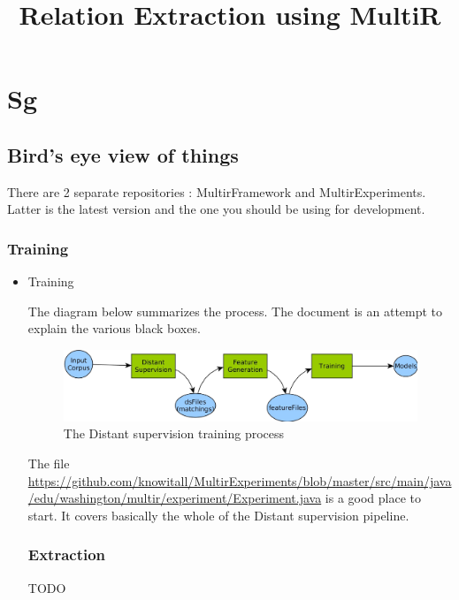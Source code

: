 \documentclass[a4paper,10pt]{report}
\title{Relation Extraction using MultiR}
\author{}
\begin{document}
\maketitle

\begin{abstract}

\end{abstract}

\newpage
\chapter{Sg}
\section{Bird's eye view of things}

There are 2 separate repositories : MultirFramework and MultirExperiments. Latter is the latest version and the one you should be using for development. 

\subsection{Training}
\begin{itemize}
 \item Training
 
 The diagram below summarizes the process. The document is an attempt to explain the various black boxes. 
\begin{figure}[h]
 \centering
 \includegraphics[bb=0 0 1109 107,scale=0.3,keepaspectratio=true]{./trainpipe.jpg}
 \caption{The Distant supervision training process}
 \label{fig:1}
\end{figure}
The file \url{https://github.com/knowitall/MultirExperiments/blob/master/src/main/java/edu/washington/multir/experiment/Experiment.java} is a good place to start.
It covers basically the whole of the Distant supervision pipeline. 

\subsection{Extraction}
TODO
 \end{itemize}
\end{document}

